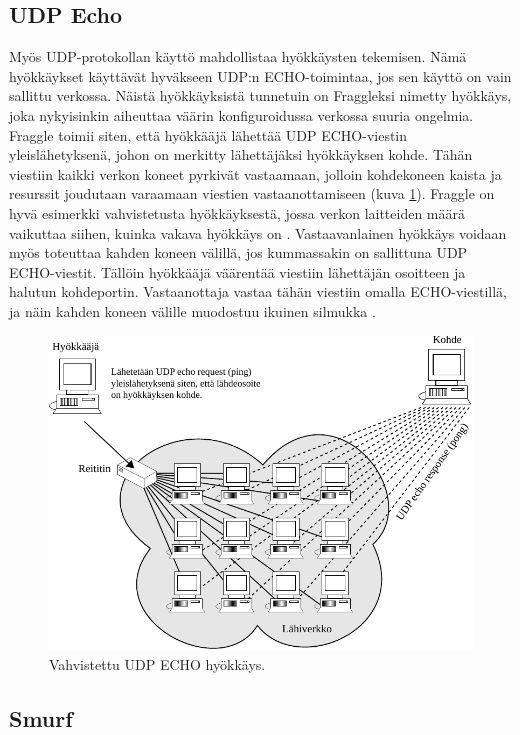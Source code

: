 \subsection{UDP Echo}

Myös UDP-protokollan käyttö mahdollistaa hyökkäysten tekemisen. Nämä
hyökkäykset käyt\-tä\-vät hyväkseen UDP:n ECHO-toimintaa, jos sen käyttö
on vain sallittu verkossa. Näistä hyökkäyksistä tunnetuin on Fraggleksi
nimetty hyökkäys, joka nykyisinkin aiheuttaa väärin konfiguroidussa verkossa suuria ongelmia.
Fraggle toimii siten, että hyökkääjä lähettää UDP ECHO-viestin yleislähetyksenä, johon on merkitty lähettäjäksi
hyökkäyksen kohde. Tähän viestiin kaikki verkon koneet pyrkivät vastaamaan,
jolloin kohdekoneen kaista ja resurssit joudutaan varaamaan viestien vastaanottamiseen (kuva \ref{fraggle}). 
Fraggle on hyvä esimerkki vahvistetusta hyökkäyksestä, jossa verkon laitteiden määrä
vaikuttaa siihen, kuinka vakava hyökkäys on \cite{WEBS}. Vastaavanlainen
hyökkäys voidaan myös toteuttaa kahden koneen välillä, jos kummassakin
on sallittuna UDP ECHO-viestit. Tällöin hyökkääjä väärentää viestiin
lähettäjän osoitteen ja halutun kohdeportin. Vastaanottaja vastaa
tähän viestiin omalla ECHO-viestillä, ja näin kahden koneen välille
muodostuu ikuinen silmukka \cite{TCP}.
\newpage
\begin{figure}[htp]
\centering
\includegraphics[width=13cm]{pics/fraggle.pdf}
\caption{Vahvistettu UDP ECHO hyökkäys.}
\label{fraggle}
\end{figure}

\subsection{Smurf}

